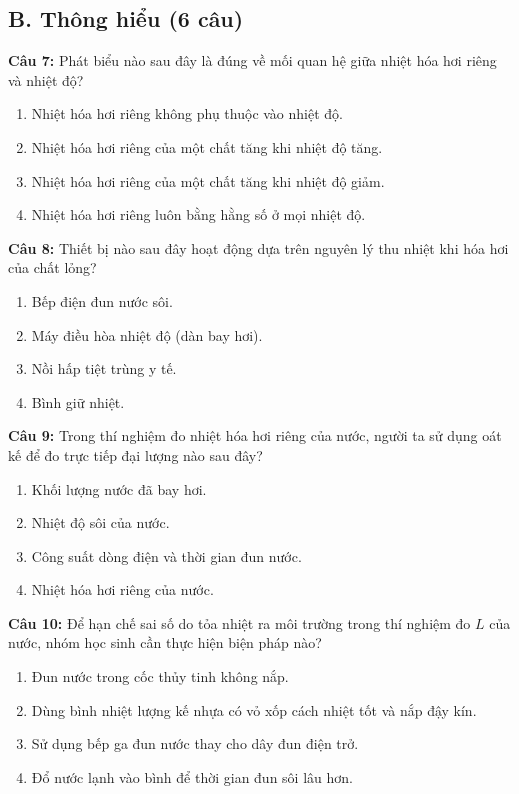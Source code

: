 \documentclass[12pt,a4paper]{article}
\begin{document}
\subsection*{B. Thông hiểu (6 câu)}

\textbf{Câu 7:} Phát biểu nào sau đây là đúng về mối quan hệ giữa nhiệt hóa hơi riêng và nhiệt độ?
\begin{enumerate}[label=\Alph*.]
  \item Nhiệt hóa hơi riêng không phụ thuộc vào nhiệt độ.
  \item Nhiệt hóa hơi riêng của một chất tăng khi nhiệt độ tăng.
  \item Nhiệt hóa hơi riêng của một chất tăng khi nhiệt độ giảm.
  \item Nhiệt hóa hơi riêng luôn bằng hằng số ở mọi nhiệt độ.
\end{enumerate}

\textbf{Câu 8:} Thiết bị nào sau đây hoạt động dựa trên nguyên lý thu nhiệt khi hóa hơi của chất lỏng?
\begin{enumerate}[label=\Alph*.]
  \item Bếp điện đun nước sôi.
  \item Máy điều hòa nhiệt độ (dàn bay hơi).
  \item Nồi hấp tiệt trùng y tế.
  \item Bình giữ nhiệt.
\end{enumerate}

\textbf{Câu 9:} Trong thí nghiệm đo nhiệt hóa hơi riêng của nước, người ta sử dụng oát kế để đo trực tiếp đại lượng nào sau đây?
\begin{enumerate}[label=\Alph*.]
  \item Khối lượng nước đã bay hơi.
  \item Nhiệt độ sôi của nước.
  \item Công suất dòng điện và thời gian đun nước.
  \item Nhiệt hóa hơi riêng của nước.
\end{enumerate}

\textbf{Câu 10:} Để hạn chế sai số do tỏa nhiệt ra môi trường trong thí nghiệm đo $L$ của nước, nhóm học sinh cần thực hiện biện pháp nào?
\begin{enumerate}[label=\Alph*.]
  \item Đun nước trong cốc thủy tinh không nắp.
  \item Dùng bình nhiệt lượng kế nhựa có vỏ xốp cách nhiệt tốt và nắp đậy kín.
  \item Sử dụng bếp ga đun nước thay cho dây đun điện trở.
  \item Đổ nước lạnh vào bình để thời gian đun sôi lâu hơn.
\end{enumerate}
\end{document}
